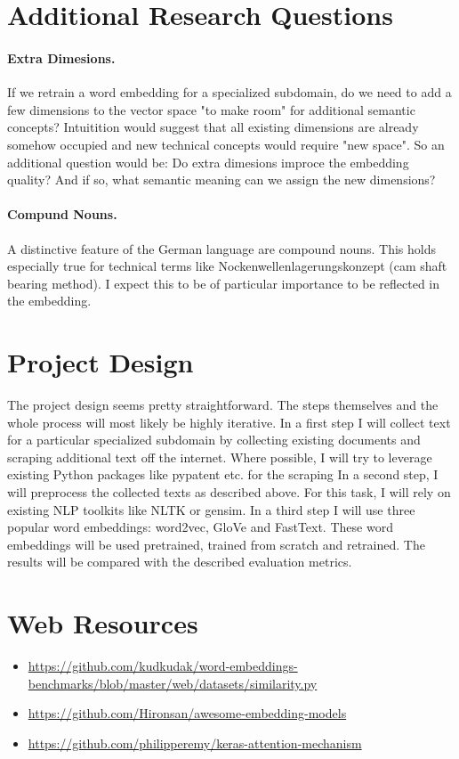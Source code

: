 \documentclass[10pt,a4paper]{article}
\begin{document}
	\section{Additional Research Questions}
	\paragraph{Extra Dimesions.} If we retrain a word embedding for a specialized subdomain, do we need to add a few dimensions to the vector space "to make room" for additional semantic concepts? Intuitition would suggest that all existing dimensions are already somehow occupied and new technical concepts would require "new space". So an additional question would be: Do extra dimesions improce the embedding quality? And if so, what semantic meaning can we assign the new dimensions? 
	\paragraph{Compund Nouns.} A distinctive feature of the German language are compound nouns. This holds especially true for technical terms like Nockenwellenlagerungskonzept (cam shaft bearing method). I expect this to be of particular importance to be reflected in the embedding. 
	
	
		
	\section{Project Design}
	The project design  seems pretty straightforward. The steps themselves and the whole process will most likely be highly iterative.
	In a first step I will collect text for a particular specialized subdomain by collecting existing documents and scraping additional text off the internet. Where possible, I will try to leverage existing Python packages like pypatent etc. for the scraping
	In a second step, I will preprocess the collected texts as described above. For this task, I will rely on existing NLP toolkits like NLTK or gensim.
	In a third step I will use three popular word embeddings: word2vec, GloVe and FastText. These word embeddings will be used pretrained, trained from scratch and retrained. The results will be compared with the described evaluation metrics.	
	

\section{Web Resources}
\label{web_resources}
\begin{itemize}
	\item \url{https://github.com/kudkudak/word-embeddings-benchmarks/blob/master/web/datasets/similarity.py}
	\item \url{https://github.com/Hironsan/awesome-embedding-models}
	\item \url{https://github.com/philipperemy/keras-attention-mechanism}
\end{itemize}



\nocite{*}




	
	
\end{document}
